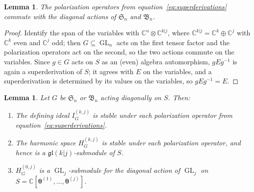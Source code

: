 \documentclass[12pt]{amsart}
\theoremstyle{plain}
\newtheorem{lemma}[theorem]{Lemma}
\theoremstyle{definition}
\DeclareMathOperator{\GL}{GL}
\newcommand{\C}{\mathbb{C}}
\begin{document}
\begin{lemma}\label{lem:polarization-commute}
    The polarization operators from equation~\eqref{eq:superderivations} commute with the diagonal actions of $\mathfrak{S}_n$ and $\mathfrak{B}_n$.
\end{lemma}

\begin{proof}
Identify the span of the variables with $\C^n \otimes \C^{k|j}$, where $\C^{k|j} = \C^k \oplus \C^j$ with $\C^k$ even and $\C^j$ odd; then $G \subseteq \GL_n$ acts on the first tensor factor and the polarization operators act on the second, so the two actions commute on the variables.
    Since $g \in G$ acts on $S$ as an (even) algebra automorphism, $g E g^{-1}$ is again a superderivation of $S$; it agrees with $E$ on the variables, and a superderivation is determined by its values on the variables, so $g E g^{-1} = E$.
\end{proof}

\begin{lemma}\label{lem:polarization-stability}
    Let $G$ be $\mathfrak{S}_n$ or $\mathfrak{B}_n$ acting diagonally on $S$. Then:
    \begin{enumerate}
        \item[(a)] The defining ideal $I_G^{(k,j)}$ is stable under each polarization operator from equation~\eqref{eq:superderivations}.
        \item[(b)] The harmonic space $H_G^{(k,j)}$ is stable under each polarization operator, and hence is a $\mathfrak{gl}(k|j)$-submodule of $S$. 
        \item[(c)] $H_G^{(0,j)}$ is a $\GL_j$-submodule for the diagonal action of $\GL_j$ on $S = \C[\bm{\theta}^{(1)}, \ldots, \bm{\theta}^{(j)}]$.
    \end{enumerate}
\end{lemma}
\end{document}
